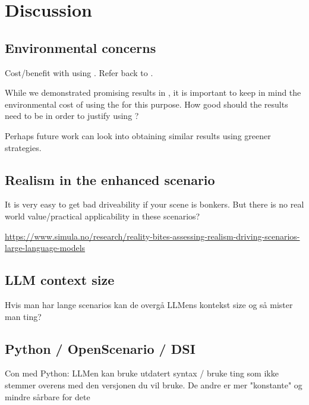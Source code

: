 
\chapter{Discussion}
\section{Environmental concerns}
Cost/benefit with using . Refer back to .

While we demonstrated promising results in , it is important to keep in mind the
environmental cost of using the  for this purpose. How good should the results need
to be in order to justify using ?

Perhaps future work can look into obtaining similar results using greener strategies.

\section{Realism in the enhanced scenario}

It is very easy to get bad driveability if your scene is bonkers. But there is no real world
value/practical applicability in these scenarios?

\url{https://www.simula.no/research/reality-bites-assessing-realism-driving-scenarios-large-language-models}

\section{LLM context size}

Hvis man har lange scenarios kan de overgå LLMens kontekst size og så mister man ting?

\section{Python / OpenScenario / DSI}

Con med Python: LLMen kan bruke utdatert syntax / bruke ting som ikke stemmer overens med den
versjonen du vil bruke. De andre er mer "konstante" og mindre sårbare for dete